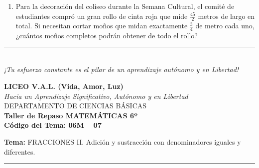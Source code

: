 \documentclass[12pt, letterpaper]{article}
\begin{document}
\begin{enumerate}[itemsep=0.8cm]
		Si el chef del comedor necesita preparar \textbf{5 porciones completas} de esta torta para un evento escolar, plantea las operaciones correspondientes y determina qué cantidad exacta de cada ingrediente deberá utilizar en total.
		
		\item Para la decoración del coliseo durante la Semana Cultural, el comité de estudiantes compró un gran rollo de cinta roja que mide $\frac{45}{2}$ metros de largo en total. Si necesitan cortar moños que midan exactamente $\frac{3}{4}$ de metro cada uno, ¿cuántos moños completos podrán obtener de todo el rollo?
		
	\end{enumerate}
	
	\vfill
	\begin{center}
		\rule{0.5\textwidth}{0.4pt} \\
		\vspace{0.2cm}
		\textit{¡Tu esfuerzo constante es el pilar de un aprendizaje autónomo y en Libertad!}
	\end{center}
	
	\newpage
	\begin{center}
		{\Large \textbf{LICEO V.A.L. (Vida, Amor, Luz)}}\\[0.1cm]
		{\normalsize \textit{Hacia un Aprendizaje Significativo, Autónomo y en Libertad}}\\[0.2cm]
		{\large DEPARTAMENTO DE CIENCIAS BÁSICAS}\\[0.1cm]
		\textbf{Taller de Repaso MATEMÁTICAS 6º}\\[0.1cm]
		\textbf{Código del Tema: 06M – 07}\\[0.1cm]
	\end{center}
	
	\vspace{0.2cm}
	\noindent \textbf{Tema:} FRACCIONES II. Adición y sustracción con denominadores iguales y diferentes.
	\vspace{0.2cm}
	\hrule
	\vspace{0.4cm}
	
\end{document}
